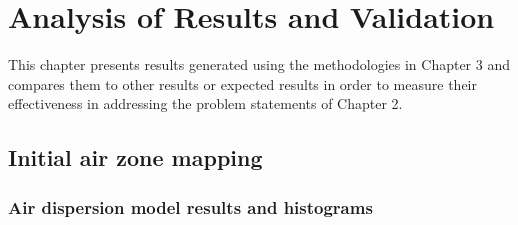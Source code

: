 \chapter{Analysis of Results and Validation}
This chapter presents results generated using the methodologies in Chapter 3 and compares them to other results or expected results in order to measure their effectiveness in addressing the problem statements of Chapter 2.

\section{Initial air zone mapping}

\subsection{Air dispersion model results and histograms}

